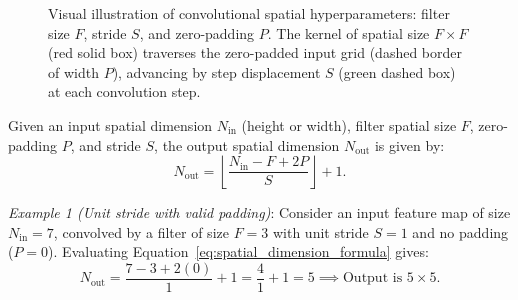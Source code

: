 \begin{figure}[H]
\caption{Visual illustration of convolutional spatial hyperparameters: filter size $F$, stride $S$, and zero-padding $P$. The kernel of spatial size $F \times F$ (red solid box) traverses the zero-padded input grid (dashed border of width $P$), advancing by step displacement $S$ (green dashed box) at each convolution step.}
\label{fig:conv_hyperparameters_f_s_p}
\end{figure}

\begin{theorem}
Given an input spatial dimension $N_{\text{in}}$ (height or width), filter spatial size $F$, zero-padding $P$, and stride $S$, the output spatial dimension $N_{\text{out}}$ is given by:
\begin{equation}
N_{\text{out}} = \left\lfloor \frac{N_{\text{in}} - F + 2P}{S} \right\rfloor + 1.
\label{eq:spatial_dimension_formula}
\end{equation}
\end{theorem}

\noindent\textit{Example 1 (Unit stride with valid padding)}: Consider an input feature map of size $N_{\text{in}} = 7$, convolved by a filter of size $F = 3$ with unit stride $S = 1$ and no padding ($P = 0$). Evaluating Equation~\eqref{eq:spatial_dimension_formula} gives:
\begin{equation}
N_{\text{out}} = \frac{7 - 3 + 2(0)}{1} + 1 = \frac{4}{1} + 1 = 5 \implies \text{Output is } 5 \times 5.
\end{equation}

